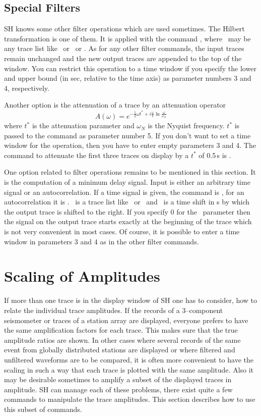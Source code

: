 \subsection{Special Filters}

SH knows some other filter operations which are used sometimes.
The Hilbert transformation is one of them.  It is applied with
the command , where \ may be any
trace list like \ or \ or .  As for any
other filter commands, the input traces remain unchanged and the
new output traces are appended to the top of the window.  You can
restrict this operation to a time window if you specify the lower
and upper bound (in sec, relative to the time axis) as parameter
numbers 3 and 4, respectively.
\smallskip

Another option is the attenuation of a trace by an attenuation
operator
\[
   A(\omega) =  e^{ -\frac{1}{2}\omega t^* +
      i\frac{\omega}{\pi}\ln\frac{\omega}{\omega_N} }
\]
where $t^*$ is the attenuation parameter and $\omega_N$ is the
Nyquist frequency.  $t^*$ is passed to the command as parameter
number 5.  If you don't want to set a time window for the operation,
then you have to enter empty parameters 3 and 4.  The command to
attenuate the first three traces on display by a $t^*$ of 0.5\,s is
.
\smallskip

One option related to filter operations remains to be mentioned
in this section.  It is the computation of a minimum delay signal.
Input is either an arbitrary time
signal or an autocorrelation.  If a time signal is given, the
command is , for an autocorrelation
it is .  \ is a trace
list like \ or \ and \ is a time
shift in s by which the output trace is shifted to the right.
If you specify 0 for the \ parameter then
the signal on the output trace starts exactly at the beginning of
the trace which is not very convenient in most cases.  Of course,
it is possible to enter a time window in parameters 3 and 4 as
in the other filter commands.


\section{Scaling of Amplitudes}

If more than one trace is in the display window of SH one has to
consider, how to relate the individual trace amplitudes.  If the
records of a 3--component seismometer or traces of a station array
are displayed, everyone prefers to have the same amplification
factors for each trace.  This makes sure that the true amplitude
ratios are shown.  In other cases where several records of the
same event from globally distributed stations are displayed or
where filtered and unfiltered waveforms are to be compared, it is
often more convenient to have the scaling in such a way that each
trace is plotted with the same amplitude.  Also it may be desirable
sometimes to amplify a subset of the displayed traces in amplitude.
SH can manage each of these problems, there exist quite a few
commands to manipulate the trace amplitudes.  This section describes
how to use this subset of commands.

